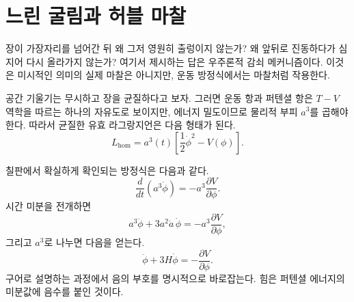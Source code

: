 \begin{classroomqa}
\end{classroomqa}

\begin{classroomqa}
\end{classroomqa}

\section{느린 굴림과 허블 마찰}

장이 가장자리를 넘어간 뒤 왜 그저 영원히 출렁이지 않는가? 왜 앞뒤로 진동하다가 심지어 다시 올라가지 않는가? 여기서 제시하는 답은 우주론적 감쇠 메커니즘이다. 이것은 미시적인 의미의 실제 마찰은 아니지만, 운동 방정식에서는 마찰처럼 작용한다.

공간 기울기는 무시하고 장을 균질하다고 보자. 그러면 운동 항과 퍼텐셜 항은 \(T-V\) 역학을 따르는 하나의 자유도로 보이지만, 에너지 밀도이므로 물리적 부피 \(a^3\)를 곱해야 한다. 따라서 균질한 유효 라그랑지언은 다음 형태가 된다.
\begin{equation}
L_{\mathrm{hom}}=a^3(t)\left[\frac12\dot\phi^2-V(\phi)\right].
\end{equation}

칠판에서 확실하게 확인되는 방정식은 다음과 같다.
\begin{equation}
\frac{d}{dt}\left(a^3\dot\phi\right)=-a^3\frac{\partial V}{\partial\phi}.
\end{equation}
시간 미분을 전개하면
\begin{equation}
a^3\ddot\phi+3a^2\dot a\,\dot\phi=-a^3\frac{\partial V}{\partial\phi},
\end{equation}
그리고 \(a^3\)로 나누면 다음을 얻는다.
\begin{equation}
\ddot\phi+3H\dot\phi=-\frac{\partial V}{\partial\phi}.
\end{equation}
구어로 설명하는 과정에서 음의 부호를 명시적으로 바로잡는다. 힘은 퍼텐셜 에너지의 미분값에 음수를 붙인 것이다.

